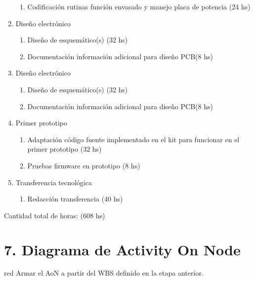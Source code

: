 \documentclass[11pt]{charter}
\begin{document}
\begin{enumerate}
\begin{enumerate}
	\item Codificación rutinas función envasado y manejo placa de potencia (24 hs)
	\end{enumerate}
\item Diseño electrónico
	\begin{enumerate}
	\item Diseño de esquemático(s) (32 hs)
	\item Documentación información adicional para diseño PCB(8 hs)
	\end{enumerate}	
\item Diseño electrónico
	\begin{enumerate}
	\item Diseño de esquemático(s) (32 hs)
	\item Documentación información adicional para diseño PCB(8 hs)
	\end{enumerate}	
\item Primer prototipo
	\begin{enumerate}
	\item Adaptación código fuente implementado en el kit para funcionar en el primer prototipo (32 hs)
	\item Pruebas firmware en prototipo (8 hs)
	\end{enumerate}	
\item Transferencia tecnológica
	\begin{enumerate}
	\item Redacción transferencia (40 hs)
	\end{enumerate}					
\end{enumerate}

Cantidad total de horas: (608 hs)




\section{7. Diagrama de Activity On Node}
\label{sec:AoN}

\begin{consigna}{red}
Armar el AoN a partir del WBS definido en la etapa anterior. 



\end{consigna}
\end{document}
